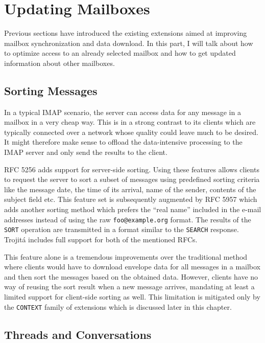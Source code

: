\documentclass[trojita]{subfiles}
\begin{document}
\section{Updating Mailboxes}

Previous sections have introduced the existing extensions aimed at improving mailbox synchronization and data download.
In this part, I will talk about how to optimize access to an already selected mailbox and how to get updated information
about other mailboxes.

\subsection{Sorting Messages}

In a typical IMAP scenario, the server can access data for any message in a mailbox in a very cheap way.  This is in a
strong contrast to its clients which are typically connected over a network whose quality could leave much to be
desired.  It might therefore make sense to offload the data-intensive processing to the IMAP server and only send the
results to the client.

RFC 5256 \cite{rfc5256} adds support for server-side sorting.  Using these features allows clients to request the server
to sort a subset of messages using predefined sorting criteria like the message date, the time of its arrival, name of
the sender, contents of the subject field etc.  This feature set is subsequently augmented by RFC 5957 \cite{rfc5957}
which adds another sorting method which prefers the ``real name'' included in the e-mail addresses instead of using the
raw {\tt foo@example.org} format.  The results of the {\tt SORT} operation are transmitted in a format similar to the
{\tt SEARCH} response.  Trojitá includes full support for both of the mentioned RFCs.

This feature alone is a tremendous improvements over the traditional method where clients would have to download
envelope data for all messages in a mailbox and then sort the messages based on the obtained data.  However, clients
have no way of reusing the sort result when a new message arrives, mandating at least a limited support for client-side
sorting as well.  This limitation is mitigated only by the {\tt CONTEXT} family of extensions which is discussed later
in this chapter.

\subsection{Threads and Conversations}
\end{document}
